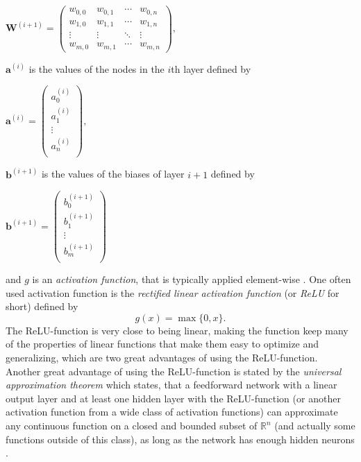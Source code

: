 \documentclass[./main.tex]{subfiles}
\begin{document}
\begin{center}
    \begin{math}
        \bm{W}^{(i + 1)} =
        \begin{pmatrix}
            w_{0, 0} & w_{0, 1} & \cdots & w_{0, n} \\
            w_{1, 0} & w_{1, 1} & \cdots & w_{1, n} \\
            \vdots & \vdots & \ddots & \vdots \\
            w_{m, 0} & w_{m, 1} & \cdots & w_{m, n}
        \end{pmatrix}
        ,
    \end{math}
\end{center}
$\bm{a}^{(i)}$ is the values of the nodes in the $i$th layer defined by
\begin{center}
    \begin{math}
        \bm{a}^{(i)} =
        \begin{pmatrix}
            a_{0} ^{(i)} \\
            a_{1} ^{(i)} \\
            \vdots \\
            a_{n} ^{(i)} \\
        \end{pmatrix}
        ,
    \end{math}
\end{center}
$\bm{b}^{(i + 1)}$ is the values of the biases of layer $i + 1$ defined by
\begin{center}
    \begin{math}
        \bm{b}^{(i + 1)} =
        \begin{pmatrix}
            b_{0} ^{(i + 1)} \\
            b_{1} ^{(i + 1)} \\
            \vdots \\
            b_{m} ^{(i + 1)} \\
        \end{pmatrix}
    \end{math}
\end{center}
and $g$ is an \textit{activation function}, that is typically applied element-wise \cite{DeepLearning} \cite{3b1b_1}. One often used activation function is the \textit{rectified linear activation function} (or \textit{ReLU} for short) defined by
$$g(x) = \max\{0, x\}.$$
The ReLU-function is very close to being linear, making the function keep many of the properties of linear functions that make them easy to optimize and generalizing, which are two great advantages of using the ReLU-function. Another great advantage of using the ReLU-function is stated by the \textit{universal approximation theorem} which states, that a feedforward network with a linear output layer and at least one hidden layer with the ReLU-function (or another activation function from a wide class of activation functions) can approximate any continuous function on a closed and bounded subset of $\mathbb{R}^n$ (and actually some functions outside of this class), as long as the network has enough hidden neurons \cite{DeepLearning}. 
\end{document}
